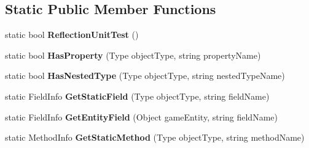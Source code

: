 \subsection*{Static Public Member Functions}
\begin{DoxyCompactItemize}
\item 
\hypertarget{class_s_e_mod_a_p_i_internal_1_1_a_p_i_1_1_entity_1_1_base_object_ac5f8660b6792e28a27bfdd5b78a2f07e}{}static bool {\bfseries Reflection\+Unit\+Test} ()\label{class_s_e_mod_a_p_i_internal_1_1_a_p_i_1_1_entity_1_1_base_object_ac5f8660b6792e28a27bfdd5b78a2f07e}

\item 
\hypertarget{class_s_e_mod_a_p_i_internal_1_1_a_p_i_1_1_entity_1_1_base_object_ab66465798870c4566138d5ee39c16c40}{}static bool {\bfseries Has\+Property} (Type object\+Type, string property\+Name)\label{class_s_e_mod_a_p_i_internal_1_1_a_p_i_1_1_entity_1_1_base_object_ab66465798870c4566138d5ee39c16c40}

\item 
\hypertarget{class_s_e_mod_a_p_i_internal_1_1_a_p_i_1_1_entity_1_1_base_object_a63c2bed4ea0f55e5e99033e01ba15787}{}static bool {\bfseries Has\+Nested\+Type} (Type object\+Type, string nested\+Type\+Name)\label{class_s_e_mod_a_p_i_internal_1_1_a_p_i_1_1_entity_1_1_base_object_a63c2bed4ea0f55e5e99033e01ba15787}

\item 
\hypertarget{class_s_e_mod_a_p_i_internal_1_1_a_p_i_1_1_entity_1_1_base_object_a710e1e164c67712a8be00895b624b349}{}static Field\+Info {\bfseries Get\+Static\+Field} (Type object\+Type, string field\+Name)\label{class_s_e_mod_a_p_i_internal_1_1_a_p_i_1_1_entity_1_1_base_object_a710e1e164c67712a8be00895b624b349}

\item 
\hypertarget{class_s_e_mod_a_p_i_internal_1_1_a_p_i_1_1_entity_1_1_base_object_a7d4e17d3dadf79ce980b7d39b99460df}{}static Field\+Info {\bfseries Get\+Entity\+Field} (Object game\+Entity, string field\+Name)\label{class_s_e_mod_a_p_i_internal_1_1_a_p_i_1_1_entity_1_1_base_object_a7d4e17d3dadf79ce980b7d39b99460df}

\item 
\hypertarget{class_s_e_mod_a_p_i_internal_1_1_a_p_i_1_1_entity_1_1_base_object_a5fb31d40b1a64216aa137888ec758f41}{}static Method\+Info {\bfseries Get\+Static\+Method} (Type object\+Type, string method\+Name)\label{class_s_e_mod_a_p_i_internal_1_1_a_p_i_1_1_entity_1_1_base_object_a5fb31d40b1a64216aa137888ec758f41}


\end{DoxyCompactItemize}
